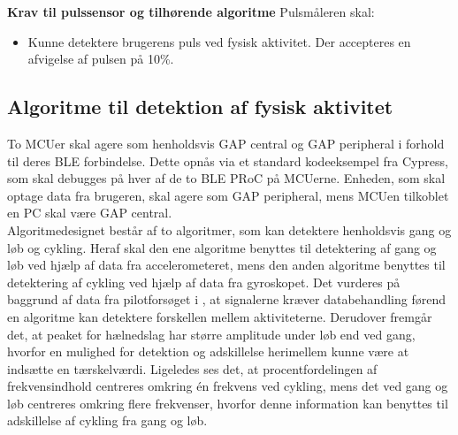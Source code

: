 \textbf{Krav til pulssensor og tilhørende algoritme} \newline
Pulsmåleren skal:
\begin{itemize}
\item Kunne detektere brugerens puls ved fysisk aktivitet. Der accepteres en afvigelse af pulsen på 10\%.
\end{itemize}
%

\subsection{Algoritme til detektion af fysisk aktivitet} \label{krav_algoritme}
To MCUer skal agere som henholdsvis GAP central og GAP peripheral i forhold til deres BLE forbindelse. Dette opnås via et standard kodeeksempel fra Cypress, som skal debugges på hver af de to BLE PRoC på MCUerne. Enheden, som skal optage data fra brugeren, skal agere som GAP peripheral, mens MCUen tilkoblet en PC skal være GAP central. \\
Algoritmedesignet består af to algoritmer, som kan detektere henholdsvis gang og løb og cykling. Heraf skal den ene algoritme benyttes til detektering af gang og løb ved hjælp af data fra accelerometeret, mens den anden algoritme benyttes til detektering af cykling ved hjælp af data fra gyroskopet. Det vurderes på baggrund af data fra pilotforsøget i , at signalerne kræver databehandling førend en algoritme kan detektere forskellen mellem aktiviteterne. Derudover fremgår det, at peaket for hælnedslag har større amplitude under løb end ved gang, hvorfor en mulighed for detektion og adskillelse herimellem kunne være at indsætte en tærskelværdi. Ligeledes ses det, at procentfordelingen af frekvensindhold centreres omkring én frekvens ved cykling, mens det ved gang og løb centreres omkring flere frekvenser, hvorfor denne information kan benyttes til adskillelse af cykling fra gang og løb. 

